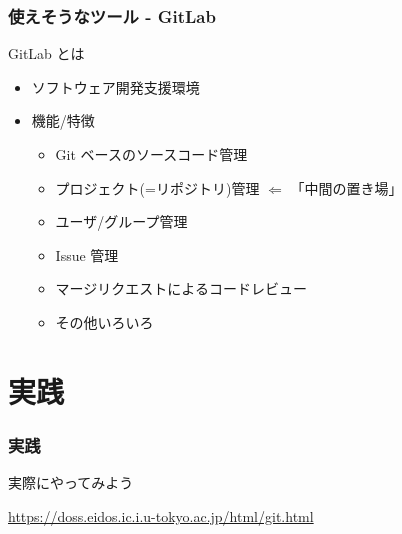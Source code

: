 \documentclass[12pt,dvipdfmx]{beamer}
\begin{document}
\begin{frame}[containsverbatim]
\frametitle{使えそうなツール - GitLab}

{\Large GitLab とは}

\begin{itemize}
\item ソフトウェア開発支援環境
\item 機能/特徴
  \begin{itemize}
  \item Git ベースのソースコード管理
  \item プロジェクト(=リポジトリ)管理 $\Leftarrow$ 「中間の置き場」
  \item ユーザ/グループ管理
  \item Issue 管理
  \item マージリクエストによるコードレビュー
  \item その他いろいろ
  \end{itemize}
\end{itemize}
\end{frame}

\section{実践}

\begin{frame}[containsverbatim]
\frametitle{実践}

\begin{center}
実際にやってみよう

\vspace{5mm}

{\small \url{https://doss.eidos.ic.i.u-tokyo.ac.jp/html/git.html}}
\end{center}
\end{frame}
\end{document}
